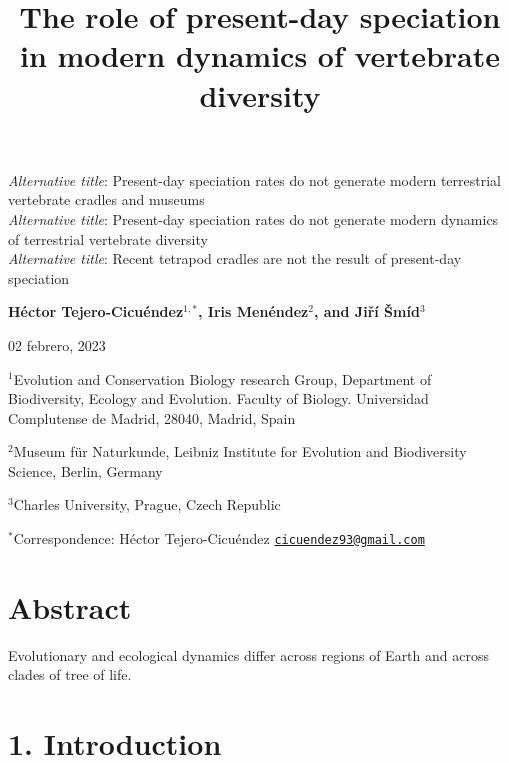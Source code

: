 \documentclass[
  11pt,
]{article}
\title{The role of present-day speciation in modern dynamics of vertebrate
diversity}
\author{}
\date{\vspace{-2.5em}}
\begin{document}
\maketitle

\emph{Alternative title}: Present-day speciation rates do not generate
modern terrestrial vertebrate cradles and museums\\
\emph{Alternative title}: Present-day speciation rates do not generate
modern dynamics of terrestrial vertebrate diversity\\
\emph{Alternative title}: Recent tetrapod cradles are not the result of
present-day speciation

\begin{center}
\textbf{H{\'{e}}ctor Tejero-Cicu{\'{e}}ndez$^{1,*}$,  Iris Men{\'{e}}ndez$^{2}$, and Jiří Šmíd$^{3}$}
\end{center}

\begin{center}02 febrero, 2023\end{center}

\(^{1}\)Evolution and Conservation Biology research Group, Department of
Biodiversity, Ecology and Evolution. Faculty of Biology. Universidad
Complutense de Madrid, 28040, Madrid, Spain

\(^{2}\)Museum für Naturkunde, Leibniz Institute for Evolution and
Biodiversity Science, Berlin, Germany

\(^{3}\)Charles University, Prague, Czech Republic

\(^{*}\)Correspondence: Héctor Tejero-Cicuéndez
\href{mailto:cicuendez93@gmail.com}{\nolinkurl{cicuendez93@gmail.com}}

\newpage

\hypertarget{abstract}{%
\section{Abstract}\label{abstract}}

Evolutionary and ecological dynamics differ across regions of Earth and
across clades of tree of life.

\newpage

\hypertarget{introduction}{%
\section{1. Introduction}\label{introduction}}
\end{document}
